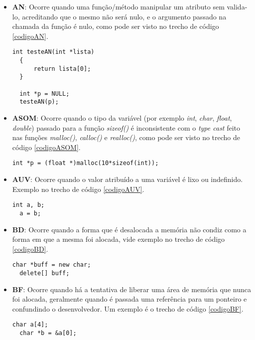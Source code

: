 \begin{itemize}
  \item \textbf{AN}: Ocorre quando uma função/método manipular um atributo sem valida-lo, acreditando que o mesmo não será 
    nulo, e o argumento passado na chamada da função é nulo, como pode ser visto no trecho de código \ref{codigoAN}.

    \begin{lstlisting}[caption={Código exemplo AN}, label=codigoAN]
  int testeAN(int *lista)
  {
      return lista[0];     
  }
  
  int *p = NULL;
  testeAN(p);
    \end{lstlisting}

  \item \textbf{ASOM}: Ocorre quando o tipo da variável (por exemplo \textit{int}, \textit{char}, \textit{float}, 
    \textit{double}) passado para a função \textit{sizeof()} é inconsistente com o \textit{type cast} feito nas funções 
    \textit{malloc()}, \textit{calloc()} e \textit{realloc()}, como pode ser visto no trecho de código \ref{codigoASOM}.

    \begin{lstlisting}[caption={Código exemplo ASOM}, label=codigoASOM]
  int *p = (float *)malloc(10*sizeof(int));
    \end{lstlisting}
  \item \textbf{AUV}: Ocorre quando o valor atribuído a uma variável é lixo ou indefinido. Exemplo no trecho de código 
    \ref{codigoAUV}.

    \begin{lstlisting}[caption={Código exemplo AUV}, label=codigoAUV]
  int a, b;
  a = b;
    \end{lstlisting}
  \item \textbf{BD}: Ocorre quando a forma que é desalocada a memória não condiz como a forma em que a mesma foi alocada, vide 
    exemplo no trecho de código \ref{codigoBD}.

    \begin{lstlisting}[caption={Código exemplo BD}, label=codigoBD]
  char *buff = new char;
  delete[] buff;
    \end{lstlisting}
  \item \textbf{BF}: Ocorre quando há a tentativa de liberar uma área de memória que nunca foi alocada, geralmente quando é 
    passada uma referência para um ponteiro e confundindo o desenvolvedor. Um exemplo é o trecho de código \ref{codigoBF}.

    \begin{lstlisting}[caption={Código exemplo BF}, label=codigoBF]
  char a[4];
  char *b = &a[0];


\end{lstlisting}
\end{itemize}
